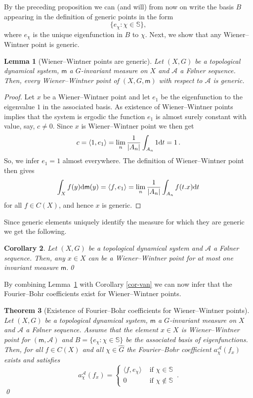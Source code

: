 \documentclass [14pt]{amsart}
\numberwithin{equation}{section}
\newcommand{\cA}{{\mathcal A}}
\newcommand{\mm}{\mathsf{m}}
\newcommand{\dd}{\mbox{\rm d}}
\newcommand{\SSS}{\mathbb S}
\newtheorem{theorem}{Theorem}[section]
\newtheorem{lemma}[theorem]{Lemma}
\newtheorem{corollary}[theorem]{Corollary}
\begin{document}
By the preceding proposition we can (and will) from now on  write the basis $B$ appearing in the definition of generic points in the form
$$\{ e_\chi : \chi \in\SSS\},$$ where $e_\chi$ is the unique eigenfunction in  $B$  to $\chi$.  Next, we show that any Wiener--Wintner point is generic.

\begin{lemma}[Wiener--Wintner points are generic]\label{se-implies-gen} Let $(X, G)$ be a topological dynamical system, $\mm$ a $G$-invariant measure on $X$ and $\cA$ a F\o lner sequence. Then, every Wiener--Wintner point of $(X,G,\mm)$ with respect to $\cA$ is generic.
\end{lemma}
\begin{proof} Let  $x$ be a Wiener--Wintner point and let
 $e_1$ be the eigenfunction to the eigenvalue $1$ in the associated basis.  As existence of Wiener--Wintner points implies that the system is ergodic the function $e_1$ is almost surely constant with value, say, $c\neq 0$.  Since $x$ is Wiener--Wintner point we then get
\[
c = \langle 1, e_1 \rangle =  \lim_n \frac{1}{|A_n|} \int_{A_n} 1 \dd t =1 \,.
\]
So, we infer $e_1 =1$ almost everywhere.
The definition of Wiener--Wintner point then gives
\[
\int_{X} f(y) \dd \mm(y)= \langle f, e_1 \rangle  = \lim_n \frac{1}{|A_n|} \int_{A_n} f(t.x) \dd t
\]
for all $f \in C(X)$, and hence $x$ is generic.
\end{proof}

Since generic elements uniquely identify the measure for which they are generic we get the following.

\begin{corollary} Let $(X,G)$ be a topological dynamical system and $\cA$ a F\o lner sequence.  Then, any $x\in X$ can be a  Wiener--Wintner point for at most one invariant measure $\mm$.\qed
\end{corollary}


By combining Lemma~\ref{se-implies-gen} with Corollary \ref{cor-van} we can now infer that the Fourier--Bohr coefficients exist for Wiener--Wintner points.

\begin{theorem}[Existence of Fourier--Bohr coefficients for Wiener--Wintner points] Let $(X, G)$ be a topological dynamical system, $\mm$ a $G$-invariant measure on $X$ and $\cA$ a F\o lner sequence. Assume that the element $x \in X$ is Wiener--Wintner point for $(\mm, \cA)$ and  $B=\{ e_\chi : \chi \in \SSS\}$ be the associated  basis of eigenfunctions.
Then, for all $f \in C(X)$ and all $\chi \in \widehat{G}$ the Fourier--Bohr coefficient $a_{\chi}^\cA(f_x)$ exists and satisfies
\[
a_{\chi}^\cA(f_x) =
\left\{
\begin{array}{lc}
\langle f, e_\chi \rangle & \mbox{  if  } \chi \in \SSS \\
0 & \mbox{ if } \chi \notin \SSS
\end{array}
\right. \, .
\]
\qed
\end{theorem}
\end{document}
